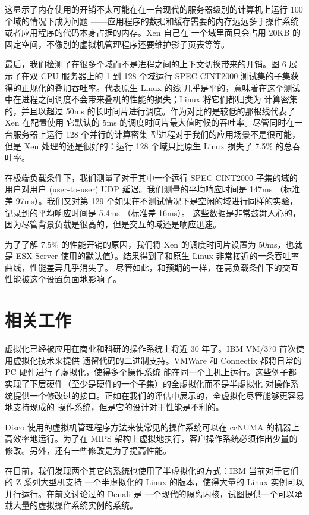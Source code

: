 这显示了内存使用的开销不太可能在在一台现代的服务器级别的计算机上运行 100 个域的情况下成为问题
——应用程序的数据和缓存需要的内存远远多于操作系统或者应用程序的代码本身占据的内存。Xen 自己在
一个域里面只会占用 20KB 的固定空间，不像别的虚拟机管理程序还要维护影子页表等等。

最后，我们检测了在很多个域而不是进程之间的上下文切换带来的开销。图 6 展示了在双 CPU 服务器上的
1 到 128 个域运行 SPEC CINT2000 测试集的子集获得的正规化的叠加吞吐率。代表原生 Linux 的线
几乎是平的，意味着在这个测试中在进程之间调度不会带来叠机的性能的损失；Linux 将它们都归类为
计算密集的，并且以超过 50ms 的长时间片进行调度。作为对比的是较低的那根线代表了 Xen 在配置使用
它默认的 5ms 的调度时间片最大值时候的吞吐率。尽管同时在一台服务器上运行 128 个并行的计算密集
型进程对于我们的应用场景不是很可能，但是 Xen 处理的还是很好的：运行 128 个域只比原生 Linux
损失了 7.5\% 的总吞吐率。

在极端负载条件下，我们测量了对于其中一个运行 SPEC CINT2000 子集的域的用户对用户
(user-to-user) UDP 延迟。我们测量的平均响应时间是 147ms （标准差 97ms）。我们又对第 129
个如果在不测试情况下是空闲的域进行同样的实验，记录到的平均响应时间是 5.4ms （标准差 16ms）。
这些数据是非常鼓舞人心的，因为尽管背景负载是很高的，但是交互的域还是响应迅速。

为了了解 7.5\% 的性能开销的原因，我们将 Xen 的调度时间片设置为 50ms，也就是 ESX Server
使用的默认值）。结果得到了和原生 Linux 非常接近的一条吞吐率曲线，性能差异几乎消失了。
尽管如此，和预期的一样，在高负载条件下的交互性能被这个设置负面地影响了。

\section{相关工作}

虚拟化已经被应用在商业和科研的操作系统上将近 30 年了。IBM VM/370 首次使用虚拟化技术来提供
遗留代码的二进制支持。VMWare 和 Connectix 都将日常的 PC 硬件进行了虚拟化，使得多个操作系统
能在同一个主机上运行。这些例子都实现了下层硬件（至少是硬件的一个子集）的全虚拟化而不是半虚拟化
对操作系统提供一个修改过的接口。正如在我们的评估中展示的，全虚拟化尽管能够更容易地支持现成的
操作系统，但是它的设计对于性能是不利的。

Disco 使用的虚拟机管理程序方法来使常见的操作系统可以在 ccNUMA 的机器上高效率地运行。为了在
MIPS 架构上虚拟地执行，客户操作系统必须作出少量的修改。另外，还有一些修改是为了提高性能。

在目前，我们发现两个其它的系统也使用了半虚拟化的方式：IBM 当前对于它们的 Z 系列大型机支持
一个半虚拟化的 Linux 的版本，使得大量的 Linux 实例可以并行运行。在前文讨论过的 Denali 是
一个现代的隔离内核，试图提供一个可以承载大量的虚拟操作系统实例的系统。

